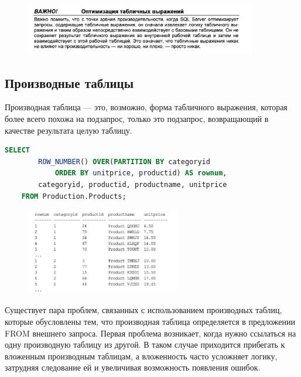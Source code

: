 \begin{figure}[h!]
	\begin{center}
		\includegraphics[width=0.9\textwidth]{img/advice8.png}
	\end{center}
	\captionsetup{justification=centering}
\end{figure}

\subsection{Производные таблицы}
Производная таблица — это, возможно, форма табличного выражения, которая более всего похожа на подзапрос, только это подзапрос, возвращающий в качестве
результата целую таблицу.

\begin{lstlisting}[label=lst:funcReturn, language=sql]
	SELECT
		ROW_NUMBER() OVER(PARTITION BY categoryid
			ORDER BY unitprice, productid) AS rownum,
		categoryid, productid, productname, unitprice
   	FROM Production.Products; 
\end{lstlisting}

\begin{figure}[h!]
	\begin{center}
		\includegraphics[width=0.6\textwidth]{img/res1.png}
	\end{center}
	\captionsetup{justification=centering}
\end{figure}

Существует пара проблем, связанных с использованием производных таблиц, которые обусловлены тем, что производная таблица определяется в предложении FROM
внешнего запроса. Первая проблема возникает, когда нужно ссылаться на одну
производную таблицу из другой. В таком случае приходится прибегать к вложенным производным таблицам, а вложенность часто усложняет логику, затрудняя
следование ей и увеличивая возможность появления ошибок.

